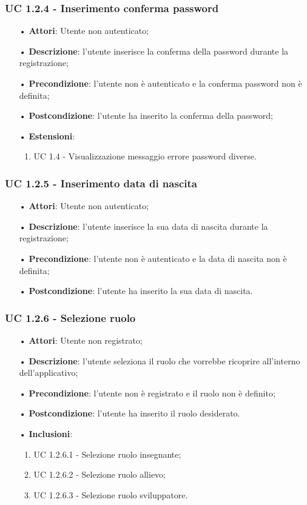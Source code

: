 \subsubsection{UC 1.2.4 - Inserimento conferma password}
\begin{itemize}
	\item[•]\textbf{Attori}: Utente non autenticato;
	\item[•]\textbf{Descrizione}: l'utente inserisce la conferma della password durante la registrazione;
	\item[•]\textbf{Precondizione}: l'utente non è autenticato e la conferma password non è definita;
	\item[•]\textbf{Postcondizione}: l'utente ha inserito la conferma della password;
	\item[•] \textbf{Estensioni}:
		\begin{enumerate}
		\item UC 1.4 - Visualizzazione messaggio errore password diverse.
	\end{enumerate}
\end{itemize}

\subsubsection{UC 1.2.5 - Inserimento data di nascita}
\begin{itemize}
	\item[•]\textbf{Attori}: Utente non autenticato;
	\item[•]\textbf{Descrizione}: l'utente inserisce la sua data di nascita durante la registrazione;
	\item[•]\textbf{Precondizione}: l'utente non è autenticato e la data di nascita non è definita;
	\item[•]\textbf{Postcondizione}: l'utente ha inserito la sua data di nascita.
\end{itemize}

\subsubsection{UC 1.2.6 - Selezione ruolo}
\begin{itemize}
	\item[•]\textbf{Attori}: Utente non registrato;
	\item[•]\textbf{Descrizione}: l'utente seleziona il ruolo che vorrebbe ricoprire all'interno dell'applicativo;
	\item[•]\textbf{Precondizione}: l'utente non è registrato e il ruolo non è definito;
	\item[•]\textbf{Postcondizione}: l'utente ha inserito il ruolo desiderato.
	\item[•]\textbf{Inclusioni}:
	\begin{enumerate}
		\item UC 1.2.6.1 - Selezione ruolo insegnante;
		\item UC 1.2.6.2 - Selezione ruolo allievo;
		\item UC 1.2.6.3 - Selezione ruolo sviluppatore.
	\end{enumerate}
\end{itemize}

